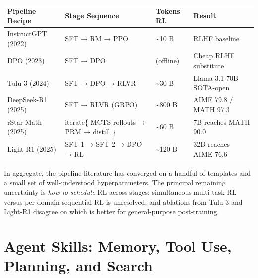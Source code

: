 {\def\LTcaptype{none} %
\begin{longtable}[]{@{}
  >{\raggedright\arraybackslash}p{}
  >{\raggedright\arraybackslash}p{}
  >{\raggedright\arraybackslash}p{}
  >{\raggedright\arraybackslash}p{}@{}}
\toprule\noalign{}
\begin{minipage}[b]{\linewidth}\raggedright
Pipeline Recipe
\end{minipage} & \begin{minipage}[b]{\linewidth}\raggedright
Stage Sequence
\end{minipage} & \begin{minipage}[b]{\linewidth}\raggedright
Tokens RL
\end{minipage} & \begin{minipage}[b]{\linewidth}\raggedright
Result
\end{minipage} \\
\midrule\noalign{}
\endhead
\bottomrule\noalign{}
\endlastfoot
InstructGPT (2022) & SFT → RM → PPO & \textasciitilde10 B & RLHF baseline \\
DPO (2023) & SFT → DPO & 0 (offline) & Cheap RLHF substitute \\
Tulu 3 (2024) & SFT → DPO → RLVR & \textasciitilde30 B & Llama-3.1-70B SOTA-open \\
DeepSeek-R1 (2025) & SFT → RLVR (GRPO) & \textasciitilde800 B & AIME 79.8 / MATH 97.3 \\
rStar-Math (2025) & iterate\{ MCTS rollouts → PRM → distill \} & \textasciitilde60 B & 7B reaches MATH 90.0 \\
Light-R1 (2025) & SFT-1 → SFT-2 → DPO → RL & \textasciitilde120 B & 32B reaches AIME 76.6 \\
\end{longtable}
}

In aggregate, the pipeline literature has converged on a handful of templates and a small set of well-understood hyperparameters. The principal remaining uncertainty is \emph{how to schedule} RL across stages: simultaneous multi-task RL versus per-domain sequential RL is unresolved, and ablations from Tulu 3 and Light-R1 disagree on which is better for general-purpose post-training.

\section{Agent Skills: Memory, Tool Use, Planning, and Search}\label{agent-skills-memory-tool-use-planning-and-search}

